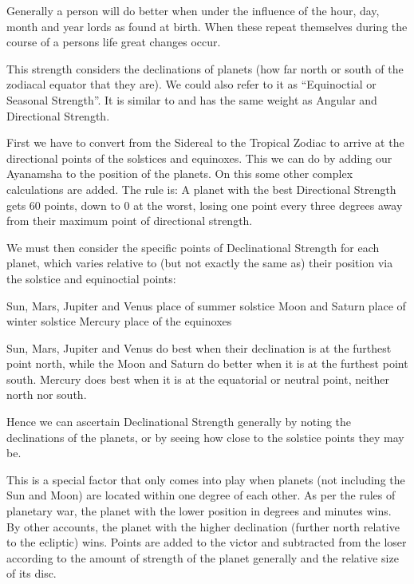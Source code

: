 Generally a person will do better when under the influence of the hour, day, month and year lords as found at birth. When these repeat themselves during the course of a persons life great changes occur.

 


 

This strength considers the declinations of planets (how far north or south of the zodiacal equator that they are). We could also refer to it as “Equinoctial or Seasonal Strength”. It is similar to and has the same weight as Angular and Directional Strength.

 

First we have to convert from the Sidereal to the Tropical Zodiac to arrive at the directional points of the solstices and equinoxes. This we can do by adding our Ayanamsha to the position of the planets. On this some other complex calculations are added. The rule is: A planet with the best Directional Strength gets 60 points, down to 0 at the worst, losing one point every three degrees away from their maximum point of directional strength.

 

We must then consider the specific points of Declinational Strength for each planet, which varies relative to (but not exactly the same as) their position via the solstice and equinoctial points:

 

Sun, Mars, Jupiter and Venus	 place of summer solstice
Moon and Saturn	 place of winter solstice
Mercury	 place of the equinoxes
 

Sun, Mars, Jupiter and Venus do best when their declination is at the furthest point north, while the Moon and Saturn do better when it is at the furthest point south. Mercury does best when it is at the equatorial or neutral point, neither north nor south.

 

Hence we can ascertain Declinational Strength generally by noting the declinations of the planets, or by seeing how close to the solstice points they may be.

 


 

This is a special factor that only comes into play when planets (not including the Sun and Moon) are located within one degree of each other. As per the rules of planetary war, the planet with the lower position in degrees and minutes wins. By other accounts, the planet with the higher declination (further north relative to the ecliptic) wins. Points are added to the victor and subtracted from the loser according to the amount of strength of the planet generally and the relative size of its disc.

